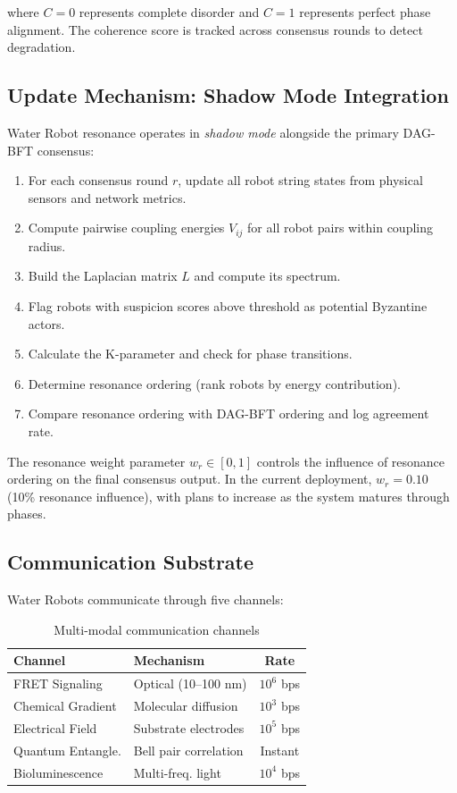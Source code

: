 \documentclass[11pt,a4paper,twocolumn]{article}
\begin{document}
\noindent where $C = 0$ represents complete disorder and $C = 1$ represents
perfect phase alignment. The coherence score is tracked across consensus rounds
to detect degradation.

\subsection{Update Mechanism: Shadow Mode Integration}

Water Robot resonance operates in \textit{shadow mode} alongside the primary
DAG-BFT consensus:

\begin{enumerate}[nosep,leftmargin=*]
    \item For each consensus round $r$, update all robot string states from physical
          sensors and network metrics.
    \item Compute pairwise coupling energies $V_{ij}$ for all robot pairs within
          coupling radius.
    \item Build the Laplacian matrix $L$ and compute its spectrum.
    \item Flag robots with suspicion scores above threshold as potential Byzantine actors.
    \item Calculate the K-parameter and check for phase transitions.
    \item Determine resonance ordering (rank robots by energy contribution).
    \item Compare resonance ordering with DAG-BFT ordering and log agreement rate.
\end{enumerate}

The resonance weight parameter $w_r \in [0, 1]$ controls the influence of
resonance ordering on the final consensus output. In the current deployment,
$w_r = 0.10$ (10\% resonance influence), with plans to increase as the system
matures through phases.

\subsection{Communication Substrate}

Water Robots communicate through five channels:

\begin{table}[H]
\centering
\caption{Multi-modal communication channels}
\label{tab:comms}
\scriptsize
\begin{tabularx}{\columnwidth}{lXc}
\toprule
\textbf{Channel} & \textbf{Mechanism} & \textbf{Rate} \\
\midrule
FRET Signaling   & Optical (10--100 nm) & $10^6$ bps \\
Chemical Gradient & Molecular diffusion  & $10^3$ bps \\
Electrical Field  & Substrate electrodes & $10^5$ bps \\
Quantum Entangle. & Bell pair correlation & Instant \\
Bioluminescence   & Multi-freq. light    & $10^4$ bps \\
\bottomrule
\end{tabularx}
\end{table}
\end{document}
